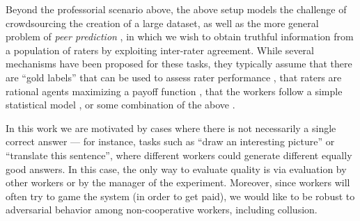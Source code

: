
Beyond the professorial scenario above, the above setup
models the challenge of crowdsourcing the creation of a large 
dataset, as well as the more general problem of \emph{peer prediction} 
\citep{miller2005eliciting}, in which we wish to obtain truthful information 
from a population of raters by exploiting inter-rater agreement. 
While several mechanisms have been proposed for these tasks, 
they typically assume that there are ``gold labels'' that can be used 
to assess rater performance \citep{resnick2007influence}, that raters are 
rational agents maximizing a payoff function \citep{dasgupta2013crowdsourced,
kamble2015truth,shnayder2016strong}, that the workers follow a simple 
statistical model \citep{karger2014budget,zhang2014crowdsourcing,
zhou2015regularized}, or some combination of the above \citep{shah2015double,
shah2015approval}. 

In this work we are motivated by cases where there is not necessarily a single 
correct answer --- for instance, tasks such as ``draw an interesting picture'' 
or ``translate this sentence'', where different workers could generate different 
equally good answers. In this case, the only way to evaluate quality is 
via evaluation by other workers or by the manager of the experiment. 
Moreover, since workers will often try to game the system (in order to 
get paid), we would like to be robust to adversarial behavior among 
non-cooperative workers, including collusion.

